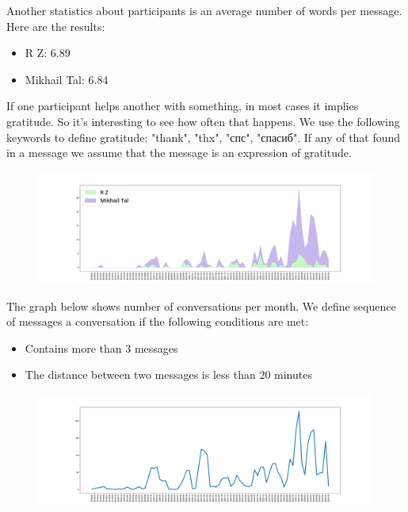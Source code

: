 \documentclass[10pt]{article}
\begin{document}
    Another statistics about participants is an average number of words per message.
    Here are the results: 
    \begin{itemize}
        \item R Z: 6.89
        \item Mikhail Tal: 6.84
    \end{itemize}
    
    If one participant helps another with something, in most cases it implies gratitude. 
    So it's interesting to see how often that happens.
    We use the following keywords to define gratitude:
    "thank", "thx", "спс", "спасиб".
    If any of that found in a message we assume that the message is an expression of gratitude.
    \begin{figure}[H]
        \includegraphics[width=1.1\textwidth]{gratitudes.png}
    \end{figure}
    
    \newpage
    The graph below shows number of conversations per month.
    We define sequence of messages a conversation if the following conditions are met:
    \begin {itemize}
        \item Contains more than 3 messages
        \item The distance between two messages is less than 20 minutes
    \end {itemize}
    \begin{figure}[H]
        \includegraphics[width=1.1\textwidth]{conversations_per_month.png}
    \end{figure}
      
\end{document}
